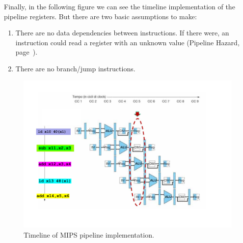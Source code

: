 \noindent
Finally, in the following figure we can see the timeline implementation of the pipeline registers. But there are two basic assumptions to make:
\begin{enumerate}
    \item There are no data dependencies between instructions. If there were, an instruction could read a register with an unknown value (Pipeline Hazard, page~\pageref{subsubsection: The problem of Pipeline Hazards}).

    \item There are no branch/jump instructions.
\end{enumerate}
\begin{figure}[!htp]
    \centering
    \includegraphics[width=\textwidth]{img/pipeline-registers-2.pdf}
    \caption{Timeline of MIPS pipeline implementation.\cite{pipelining-slides}}
\end{figure}